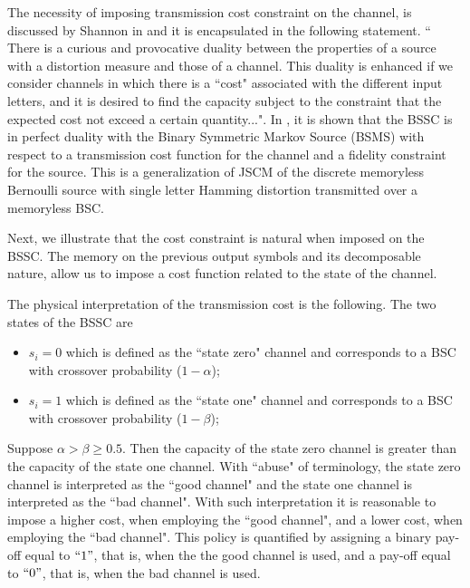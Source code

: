 \documentclass[11pt, a4paper, journal,onecolumn]{IEEEtran}
\begin{document}
\par  The necessity  of imposing transmission cost constraint on the channel, is  discussed by Shannon in \cite[pp.~162--163]{Shannon59} and it is encapsulated in the following statement. `` There is a curious and provocative duality between the properties of a source with a distortion measure and those of a channel. This duality is enhanced if we consider channels in which there is a ``cost" associated with the different input letters, and it is desired to find the capacity subject to the constraint that the expected cost not exceed a certain quantity...". In \cite{kcbisit2015}, it is shown that the BSSC is in perfect duality with the Binary Symmetric Markov Source (BSMS) with respect to a transmission cost function for the channel and a fidelity constraint for the source. This is a generalization of JSCM of the discrete memoryless Bernoulli source with single letter Hamming distortion transmitted over a memoryless BSC.
\par Next, we illustrate that the cost constraint is natural when imposed on  the BSSC. The memory on the previous output symbols and its decomposable nature, allow us to impose a cost function related to the state of the channel.  
\par The physical interpretation of the transmission cost is the following. The two states of the BSSC are
\begin{itemize}
\item $s_i=0$ which is defined as the ``state zero" channel and corresponds to a BSC with crossover probability ($1-\alpha$);
\item $s_i=1$ which is defined as the ``state one" channel and corresponds to a BSC with crossover probability ($1-\beta$);
\end{itemize}
Suppose  $\alpha>\beta\geq 0.5$. 
Then the capacity of the state zero channel is greater than the capacity of the state one channel. With ``abuse" of terminology,  the state zero channel is interpreted as the ``good channel" and the state one channel is interpreted as the ``bad channel". With such interpretation   it is reasonable to impose a higher cost, 
when employing the ``good channel", and a lower cost, when employing the ``bad channel".   This policy is quantified by assigning a binary pay-off  equal to $``1"$, that is, when the the good channel is used, and  a pay-off equal to $``0"$, that is, when  the bad channel is used. \\
\end{document}
